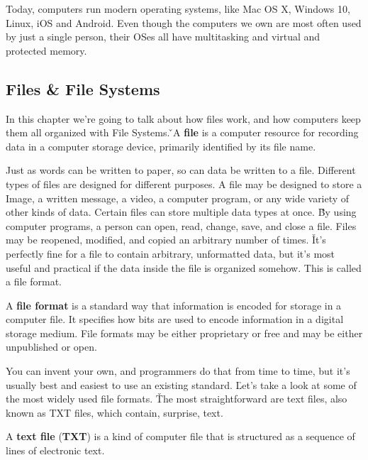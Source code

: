 Today, computers run modern operating systems, like Mac OS X, Windows 10, Linux, iOS and Android. Even though the
computers we own are most often used by just a single person, their OSes all have multitasking and virtual and
protected memory.

\subsection{Files \& File Systems}

In this chapter we're going to talk about how files work, and how computers keep them all organized with File Systems. \v

\bd[File]
A \textbf{file} is a computer resource for recording data in a computer storage device, primarily identified by its
file name.
\ed

Just as words can be written to paper, so can data be written to a file. Different types of files are designed for
different purposes. A file may be designed to store a Image, a written message, a video, a computer program, or any
wide variety of other kinds of data. Certain files can store multiple data types at once. \v

By using computer programs, a person can open, read, change, save, and close a file. Files may be reopened, modified,
and copied an arbitrary number of times. \v

It's perfectly fine for a file to contain arbitrary, unformatted data, but it's most useful and practical if the data
inside the file is organized somehow. This is called a file format.

A \textbf{file format} is a standard way that information is encoded for storage in a computer file. It specifies how
bits are used to encode information in a digital storage medium. File formats may be either proprietary or free and
may be either unpublished or open.
\ed

You can invent your own, and programmers do that from time to time, but it's usually best and easiest to use an
existing standard. \v

Let's take a look at some of the most widely used file formats. \v

The most straightforward are text files, also known as TXT files, which contain, surprise, text.

A \textbf{text file} (\textbf{TXT}) is a kind of computer file that is structured as a sequence of lines of
electronic text.
\ed

